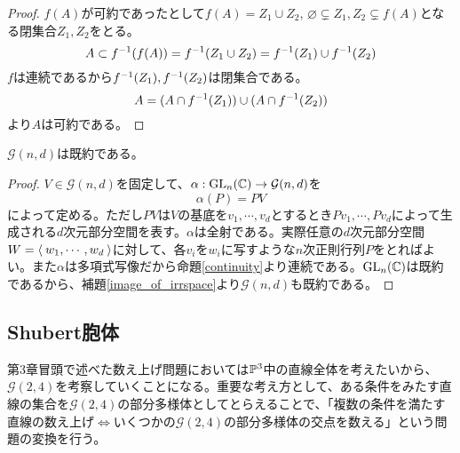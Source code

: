 \documentclass{ltjsreport}
\begin{document}
\begin{proof}
  $f(A)$が可約であったとして$f(A)=Z_1\cup Z_2$, $\varnothing\subsetneq Z_1,Z_2\subsetneq f(A)$となる閉集合$Z_1,Z_2$をとる。
  \[
  A\subset f^{-1}(f(A))=f^{-1}(Z_1\cup Z_2)=f^{-1}(Z_1)\cup f^{-1}(Z_2)  
  \]
  $f$は連続であるから$f^{-1}(Z_1), f^{-1}(Z_2)$は閉集合である。
  \[
  A=(A\cap f^{-1}(Z_1))\cup(A\cap f^{-1}(Z_2))
  \]
  より$A$は可約である。
\end{proof}

\begin{prop}
  $\mathcal{G}(n,d)$は既約である。
\end{prop}

\begin{proof}
  $V\in\mathcal{G}(n,d)$を固定して、$\alpha:\text{GL}_n(\mathbb{C})\rightarrow\mathcal{G}(n,d)$を
  \[
  \alpha(P)=PV  
  \]
  によって定める。ただし$PV$は$V$の基底を$v_1,\cdots,v_d$とするとき$Pv_1,\cdots,Pv_d$によって生成される$d$次元部分空間を表す。$\alpha$は全射である。実際任意の$d$次元部分空間$W=\langle\:w_1,\cdots,w_d\:\rangle$に対して、各$v_i$を$w_i$に写すような$n$次正則行列$P$をとればよい。また$\alpha$は多項式写像だから命題\ref{continuity}より連続である。$\text{GL}_n(\mathbb{C})$は既約であるから、補題\ref{image_of_irrspace}より$\mathcal{G}(n,d)$も既約である。
\end{proof}






\subsection{Shubert胞体}

第3章冒頭で述べた数え上げ問題においては$\mathbb{P}^3$中の直線全体を考えたいから、$\mathcal{G}(2,4)$を考察していくことになる。重要な考え方として、ある条件をみたす直線の集合を$\mathcal{G}(2,4)$の部分多様体としてとらえることで、「複数の条件を満たす直線の数え上げ$\Leftrightarrow$いくつかの$\mathcal{G}(2,4)$の部分多様体の交点を数える」という問題の変換を行う。
\end{document}
